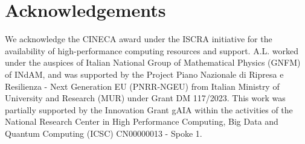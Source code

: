 \section*{Acknowledgements} 
We acknowledge the CINECA award under the ISCRA initiative for the availability of high-performance computing resources and support. A.L. worked under the auspices of Italian National Group of Mathematical Physics (GNFM) of INdAM, and was supported by the Project Piano Nazionale di Ripresa e Resilienza - Next Generation EU (PNRR-NGEU) from Italian Ministry of University and Research (MUR) under Grant DM 117/2023. This work was partially supported by the Innovation Grant gAIA within the activities of the National Research Center in High Performance Computing, Big Data and Quantum Computing (ICSC) CN00000013 - Spoke 1.
